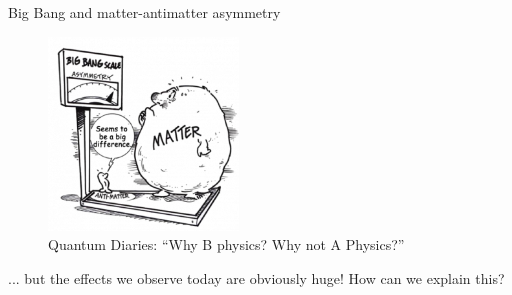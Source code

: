\documentclass{beamer}
\begin{document}
\begin{frame}{Big Bang and matter-antimatter asymmetry}
  \begin{figure}
    \includegraphics[width=0.45\textwidth]{Plots/MatterAntimatterBigAsymmetry.png}
    \caption*{\tiny Quantum Diaries: ``Why B physics? Why not A Physics?''}
  \end{figure}
  \vspace{-0.5cm}
  \begin{center}
    \Large ... but the effects we observe today are obviously huge! How can we explain this?
  \end{center}
\end{frame}
\end{document}
